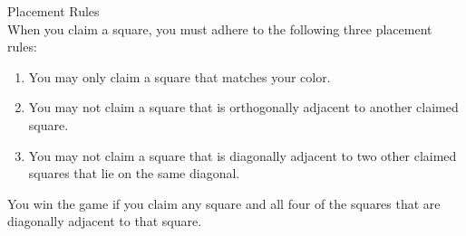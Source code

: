 \begin{minipage}{6cm}\raggedright
{\setmainfont[Scale=0.95]{Century Gothic-Bold}\LARGE Placement Rules}\\[1.0ex]

\setmainfont{Tex Gyre Schola}
When you claim a square, you must adhere to the following three placement rules:
\begin{enumerate}[leftmargin=*]
	\item You may only claim a square that matches your color.
	\item You may not claim a square that is orthogonally adjacent to another claimed square.
	\item You may not claim a square that is diagonally adjacent to two other claimed squares that lie on the same diagonal.
\end{enumerate}
You win the game if you claim any square and all four of the squares that are diagonally adjacent to that square.\\[3ex]
%
\end{minipage}